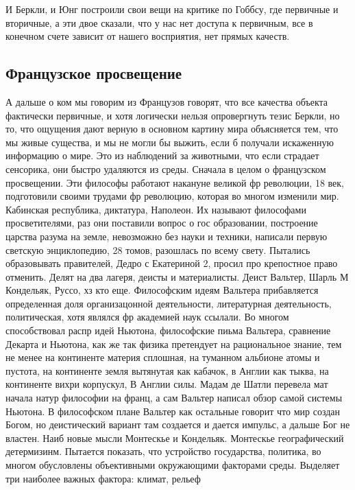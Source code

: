 \documentclass[a4paper, 12pt]{article}
\begin{document}
И Беркли, и Юнг построили свои вещи на критике по Гоббсу, где первичные 
и вторичные, а эти двое сказали, что у нас нет доступа к первичным, все 
в конечном счете зависит от нашего восприятия, нет прямых качеств.


\subsection{Французское просвещение}

А дальше о ком мы говорим из Французов говорят, что все качества объекта 
фактически первичные, и хотя логически нельзя опровергнуть тезис Беркли, 
но то, что ощущения дают верную в основном картину мира объясняется тем, 
что мы живые существа, и мы не могли бы выжить, если б получали 
искаженную информацию о мире. Это из наблюдений за животными, что если 
страдает сенсорика, они быстро удаляются из среды. Сначала в целом 
о французском просвещении. Эти философы работают накануне великой фр 
революции, 18 век, подготовили своими трудами фр революцию, которая во 
многом изменили мир. Кабинская республика, диктатура, Наполеон. Их 
называют философами просветителями, раз они поставили вопрос о гос 
образовании, построение царства разума на земле, невозможно без науки 
и техники, написали первую светскую энциклопедию, 28 томов, разошлась по 
всему свету. Пытались образовывать правителей, Дедро с Екатериной 2, 
просил про крепостное право отменить. Делят на два лагеря, деисты 
и материалисты. Деист Вальтер, Шарль М Кондельяк, Руссо, хз кто еще. 
Философским идеям Вальтера прибавляется определенная доля организацонной 
деятельности, литературная деятельность, политическая, хотя являлся фр 
академией наук ссылали. Во многом способствовал распр идей Ньютона, 
философские пиьма Вальтера, сравнение Декарта и Ньютона, как же так 
физика претендует на рациональное знание, тем не менее на континенте 
материя сплошная, на туманном альбионе атомы и пустота, на континенте 
земля вытянутая как кабачок, в Англии как тыква, на континенте вихри 
корпускул, В Англии силы. Мадам де Шатли перевела мат начала натур 
философии на франц, а сам Вальтер написал обзор самой системы Ньютона. 
В философском плане Вальтер как остальные говорит что мир создан Богом, 
но деистический вариант там создается и дается импульс, а дальше Бог не 
властен. Наиб новые мысли Монтескье и Кондельяк. Монтескье 
географический детермизинм. Пытается показать, что устройство 
государства, политика, во многом обусловлены объективными окружающими 
факторами среды. Выделяет три наиболее важных фактора: климат, рельеф 
\end{document}
